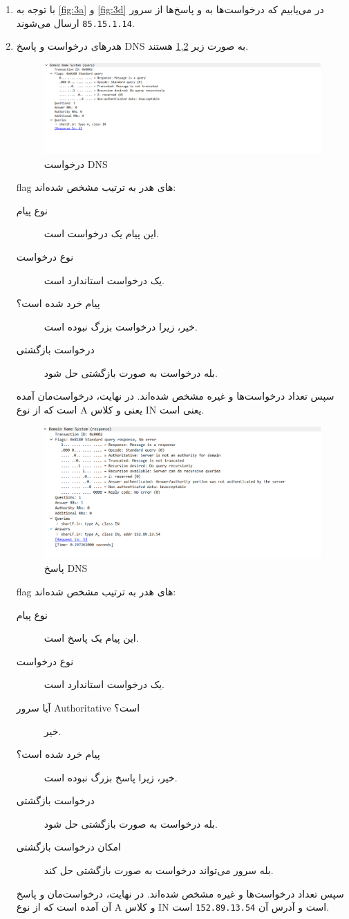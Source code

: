 \documentclass{perassignments}
\begin{document}
	\begin{enumerate}
		\item
		با توجه به 
		\ref{fig:3a} 
		و
		\ref{fig:3d}
		در می‌یابیم که درخواست‌ها به و پاسخ‌ها از سرور 
		\texttt{85.15.1.14}
		ارسال می‌شوند.
		\item 
		هدر‌های درخواست و پاسخ DNS به صورت زیر 
		\ref{fig:3b},\ref{fig:3c}
		هستند. 
				\begin{figure}[H]
			\centering
			\includegraphics[width= 0.7\linewidth]{graphics/3b.png}
			\caption{درخواست DNS}
			\label{fig:3b}
		\end{figure}
		flag‌
		های هدر به ترتیب مشخص شده‌اند:
		\begin{description}
			\item [نوع پیام]
			این پیام یک درخواست است.
			\item [نوع درخواست]
			یک درخواست استاندارد است.
			\item [پیام خرد شده است؟]
			خیر، زیرا درخواست بزرگ نبوده است.
			\item[درخواست بازگشتی]
			بله درخواست به صورت بازگشتی حل شود.
		\end{description}
		سپس تعداد درخواست‌ها و غیره مشخص شده‌اند. در نهایت، درخواست‌مان آمده است که از نوع A یعنی 
		و کلاس IN
		یعنی 
		است. 
		\begin{figure}[H]
			\centering
			\includegraphics[width= 0.7\linewidth]{graphics/3c.png}
			\caption{پاسخ DNS}
			\label{fig:3c}
		\end{figure}
			flag‌
		های هدر به ترتیب مشخص شده‌اند:
		\begin{description}
			\item [نوع پیام]
			این پیام یک پاسخ است.
			\item [نوع درخواست]
			یک درخواست استاندارد است.
			\item [آیا سرور Authoritative است؟]
			خیر.
			\item [پیام خرد شده است؟]
			خیر، زیرا پاسخ بزرگ نبوده است.
			\item[درخواست بازگشتی]
			بله درخواست به صورت بازگشتی حل شود.
			\item[امکان درخواست بازگشتی]
			بله سرور می‌تواند درخواست به صورت بازگشتی حل کند.
		\end{description}
		سپس تعداد درخواست‌ها و غیره مشخص شده‌اند. در نهایت، درخواست‌مان و پاسخ آن آمده است که از نوع A و کلاس IN است و آدرس آن 
		\texttt{152.89.13.54}
		است. 
	\end{enumerate}
\end{document}
